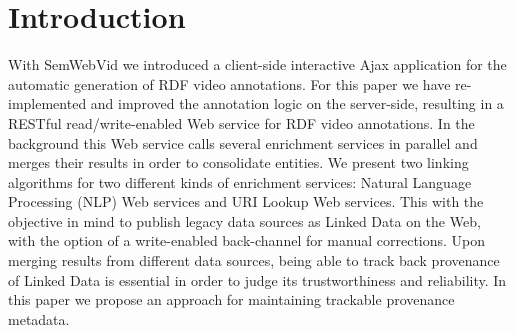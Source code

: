 \documentclass{acm_proc_article-sp}
\begin{document}



\section{Introduction}\label{sec:introduction}
With SemWebVid \cite{Steiner:SemWebVid} we introduced a client-side interactive Ajax application for the automatic generation of RDF video annotations. For this paper we have re-implemented and improved the annotation logic on the server-side, resulting in a RESTful read/write-enabled Web service for RDF video annotations. In the background this Web service calls several enrichment services in parallel and merges their results in order to consolidate entities. We present two linking algorithms for two different kinds of enrichment services: Natural Language Processing (NLP) Web services and URI Lookup Web services. This with the objective in mind to publish legacy data sources as Linked Data on the Web, with the option of a write-enabled back-channel for manual corrections. Upon merging results from different data sources, being able to track back provenance of Linked Data is essential in order to judge its trustworthiness and reliability. In this paper we propose an approach for maintaining trackable provenance metadata.
\end{document}
